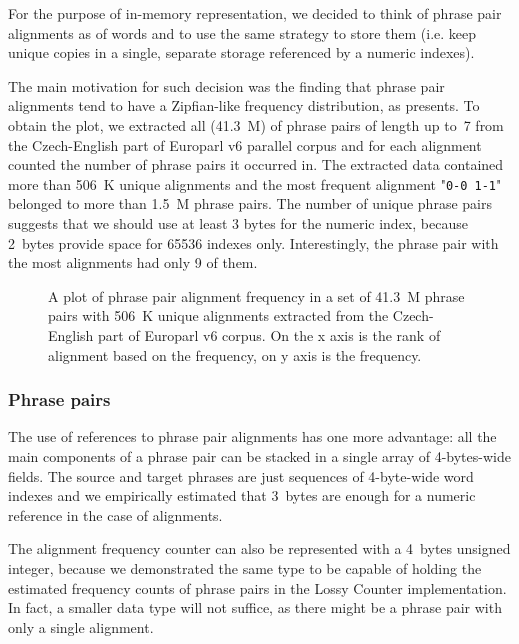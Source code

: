 For the purpose of in-memory representation, we decided to think of phrase pair alignments
as of words and to use the same strategy to store them (i.e. keep unique copies in a single,
separate storage referenced by a numeric indexes).

The main motivation for such decision was the finding that phrase pair alignments tend to
have a Zipfian-like frequency distribution, as  presents.
To obtain the plot, we extracted all (41.3~M) of phrase pairs of length up to~7 from the Czech-English
part of Europarl v6 parallel corpus and for each alignment counted the number of phrase pairs
it occurred in.
The extracted data contained more than 506~K unique alignments and the most frequent alignment
"\texttt{0-0 1-1}" belonged to more than 1.5~M phrase pairs.
The number of unique phrase pairs suggests that we should use at least 3 bytes
for the numeric index, because 2~bytes provide space for 65536 indexes only.
Interestingly, the phrase pair with the most alignments had only 9 of them.

\begin{figure}[ht]
  
  \caption{
    A plot of phrase pair alignment frequency in a set of 41.3~M phrase pairs with
    506~K unique alignments extracted from the Czech-English part of Europarl v6 corpus.
    On the x axis is the rank of alignment based on the frequency, on y axis is the frequency.
  }
  \label{fig:alignment-dist}
\end{figure}

\subsubsection*{Phrase pairs}

The use of references to phrase pair alignments has one more advantage: all the main
components of a phrase pair can be stacked in a single array of 4-bytes-wide fields.
The source and target phrases are just sequences of 4-byte-wide word indexes and
we empirically estimated that 3~bytes are enough for a numeric reference in the case
of alignments.

The alignment frequency counter can also be represented with a 4~bytes unsigned integer,
because we demonstrated the same type to be capable of holding the estimated frequency
counts of phrase pairs in the Lossy Counter implementation.
In fact, a smaller data type will not suffice, as there might be a phrase pair with only
a single alignment.

